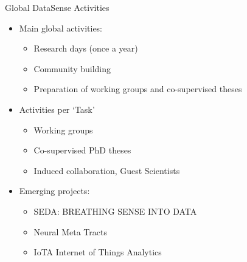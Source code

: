 \begin{frame}{Global DataSense Activities}

  \begin{itemize}
  \item Main global activities:
    \begin{itemize}
    \item Research days (once a year)
    \item Community building
    \item Preparation of working groups and co-supervised theses
    \end{itemize}

  \item Activities per `Task'
    \begin{itemize}
    \item Working groups
    \item Co-supervised PhD theses
    \item Induced collaboration, Guest Scientists
    \end{itemize}

  \item Emerging projects: 
    \begin{itemize}
    \item SEDA: BREATHING SENSE INTO DATA
    \item Neural Meta Tracts
    \item IoTA Internet of Things Analytics
    \end{itemize}
  \end{itemize}

\end{frame}

